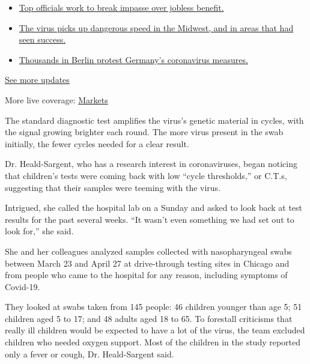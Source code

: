 \begin{itemize}
\tightlist
\item
  \href{https://www.nytimes.com/2020/08/01/world/coronavirus-covid-19.html?action=click\&pgtype=Article\&state=default\&region=MAIN_CONTENT_1\&context=storylines_live_updates\#link-3ac56579}{Top
  officials work to break impasse over jobless benefit.}
\item
  \href{https://www.nytimes.com/2020/08/01/world/coronavirus-covid-19.html?action=click\&pgtype=Article\&state=default\&region=MAIN_CONTENT_1\&context=storylines_live_updates\#link-8796723}{The
  virus picks up dangerous speed in the Midwest, and in areas that had
  seen success.}
\item
  \href{https://www.nytimes.com/2020/08/01/world/coronavirus-covid-19.html?action=click\&pgtype=Article\&state=default\&region=MAIN_CONTENT_1\&context=storylines_live_updates\#link-25930521}{Thousands
  in Berlin protest Germany's coronavirus measures.}
\end{itemize}

\href{https://www.nytimes.com/2020/08/01/world/coronavirus-covid-19.html?action=click\&pgtype=Article\&state=default\&region=MAIN_CONTENT_1\&context=storylines_live_updates}{See
more updates}

More live coverage:
\href{https://www.nytimes.com/live/2020/07/31/business/stock-market-today-coronavirus?action=click\&pgtype=Article\&state=default\&region=MAIN_CONTENT_1\&context=storylines_live_updates}{Markets}

The standard diagnostic test amplifies the virus's genetic material in
cycles, with the signal growing brighter each round. The more virus
present in the swab initially, the fewer cycles needed for a clear
result.

Dr. Heald-Sargent, who has a research interest in coronaviruses, began
noticing that children's tests were coming back with low ``cycle
thresholds,'' or C.T.s, suggesting that their samples were teeming with
the virus.

Intrigued, she called the hospital lab on a Sunday and asked to look
back at test results for the past several weeks. ``It wasn't even
something we had set out to look for,'' she said.

She and her colleagues analyzed samples collected with nasopharyngeal
swabs between March 23 and April 27 at drive-through testing sites in
Chicago and from people who came to the hospital for any reason,
including symptoms of Covid-19.

They looked at swabs taken from 145 people: 46 children younger than age
5; 51 children aged 5 to 17; and 48 adults aged 18 to 65. To forestall
criticisms that really ill children would be expected to have a lot of
the virus, the team excluded children who needed oxygen support. Most of
the children in the study reported only a fever or cough, Dr.
Heald-Sargent said.

